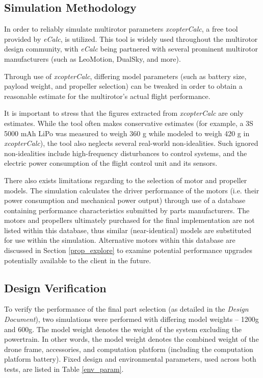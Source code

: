 \subsection{Simulation Methodology}
In order to reliably simulate multirotor parameters \textit{xcopterCalc}, a free tool provided by \textit{eCalc}, is utilized. This tool is widely used throughout the multirotor design community, with \textit{eCalc} being partnered with several prominent multirotor manufacturers (such as LeoMotion, DualSky, and more).

Through use of \textit{xcopterCalc}, differing model parameters (such as battery size, payload weight, and propeller selection) can be tweaked in order to obtain a reasonable estimate for the multirotor's actual flight performance. 

It is important to stress that the figures extracted from \textit{xcopterCalc} are only estimates. While the tool often makes conservative estimates (for example, a 3S 5000 mAh LiPo was measured to weigh 360 g while modeled to weigh 420 g in \textit{xcopterCalc}), the tool also neglects several real-world non-idealities. Such ignored non-idealities include high-frequency disturbances to control systems, and the electric power consumption of the flight control unit and its sensors. 

There also exists limitations regarding to the selection of motor and propeller models. The simulation calculates the driver performance of the motors (i.e. their power consumption and mechanical power output) through use of a database containing performance characteristics submitted by parts manufacturers. The motors and propellers ultimately purchased for the final implementation are not listed within this database, thus similar (near-identical) models are substituted for use within the simulation. Alternative motors within this database are discussed in Section \ref{prop_explore} to examine potential performance upgrades potentially available to the client in the future.

\subsection{Design Verification}
To verify the performance of the final part selection (as detailed in the \textit{Design Document}), two simulations were performed with differing model weights -- 1200g and 600g. The model weight denotes the weight of the system excluding the powertrain. In other words, the model weight denotes the combined weight of the drone frame, accessories, and computation platform (including the computation platform battery). Fixed design and environmental parameters, used across both tests, are listed in Table \ref{env_param}.

